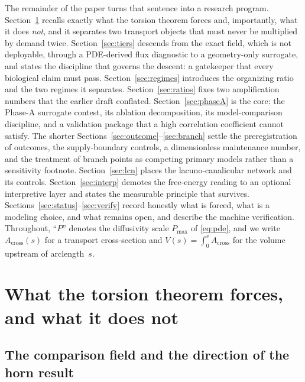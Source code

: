 \documentclass[11pt]{article}
\theoremstyle{remark}
\newcommand{\Acr}{A_{\mathrm{cross}}}
\begin{document}
The remainder of the paper turns that sentence into a research program.
Section~\ref{sec:forced} recalls exactly what the torsion theorem forces and,
importantly, what it does \emph{not}, and it separates two transport objects that
must never be multiplied by demand twice. Section~\ref{sec:tiers} descends from
the exact field, which is not deployable, through a PDE-derived flux diagnostic to
a geometry-only surrogate, and states the discipline that governs the descent: a
gatekeeper that every biological claim must pass. Section~\ref{sec:regimes}
introduces the organizing ratio and the two regimes it separates.
Section~\ref{sec:ratios} fixes two amplification numbers that the earlier draft
conflated. Section~\ref{sec:phaseA} is the core: the Phase-A surrogate contest,
its ablation decomposition, its model-comparison discipline, and a validation
package that a high correlation coefficient cannot satisfy. The shorter
Sections~\ref{sec:outcome}--\ref{sec:branch} settle the preregistration of
outcomes, the supply-boundary controls, a dimensionless maintenance number, and
the treatment of branch points as competing primary models rather than a
sensitivity footnote. Section~\ref{sec:lcn} places the lacuno-canalicular network
and its controls. Section~\ref{sec:interp} demotes the free-energy reading to an
optional interpretive layer and states the measurable principle that survives.
Sections~\ref{sec:status}--\ref{sec:verify} record honestly what is forced, what
is a modeling choice, and what remains open, and describe the machine
verification. Throughout, ``$P$'' denotes the diffusivity scale $P_{\max}$ of
\eqref{eq:pde}, and we write $\Acr(s)$ for a transport cross-section and
$V(s)=\int_0^s\Acr$ for the volume upstream of arclength~$s$.

\section{What the torsion theorem forces, and what it does not}\label{sec:forced}

\subsection{The comparison field and the direction of the horn result}
\end{document}
